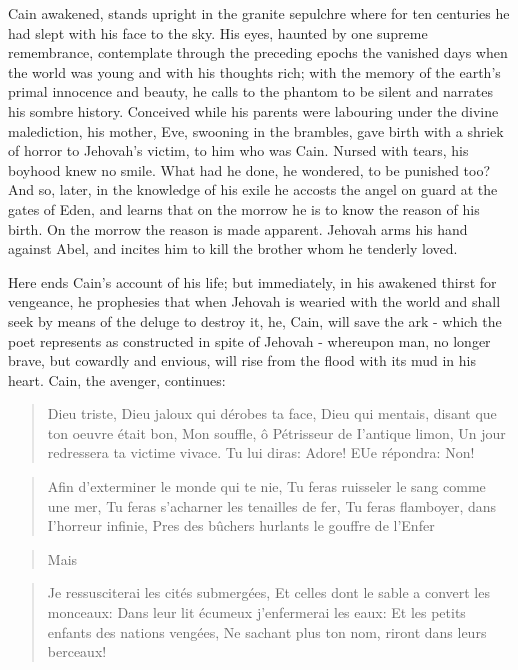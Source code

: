 \documentclass[]{book}
\begin{document}
Cain awakened, stands upright in the granite sepulchre where for ten
centuries he had slept with his face to the sky. His eyes, haunted by
one supreme remembrance, contemplate through the preceding epochs the
vanished days when the world was young and with his thoughts rich; with
the memory of the earth's primal innocence and beauty, he calls to the
phantom to be silent and narrates his sombre history. Conceived while
his parents were labouring under the divine malediction, his mother,
Eve, swooning in the brambles, gave birth with a shriek of horror to
Jehovah's victim, to him who was Cain. Nursed with tears, his boyhood
knew no smile. What had he done, he wondered, to be punished too? And
so, later, in the knowledge of his exile he accosts the angel on guard
at the gates of Eden, and learns that on the morrow he is to know the
reason of his birth. On the morrow the reason is made apparent. Jehovah
arms his hand against Abel, and incites him to kill the brother whom he
tenderly loved.

Here ends Cain's account of his life; but immediately, in his awakened
thirst for vengeance, he prophesies that when Jehovah is wearied with
the world and shall seek by means of the deluge to destroy it, he, Cain,
will save the ark - which the poet represents as constructed in spite of
Jehovah - whereupon man, no longer brave, but cowardly and envious, will
rise from the flood with its mud in his heart. Cain, the avenger,
continues:

\begin{quote}
Dieu triste, Dieu jaloux qui dérobes ta face, Dieu qui mentais, disant
que ton oeuvre était bon, Mon souffle, ô Pétrisseur de I'antique limon,
Un jour redressera ta victime vivace. Tu lui diras: Adore! EUe répondra:
Non!
\end{quote}

\begin{quote}
Afin d'exterminer le monde qui te nie, Tu feras ruisseler le sang comme
une mer, Tu feras s'acharner les tenailles de fer, Tu feras flamboyer,
dans I'horreur infinie, Pres des bûchers hurlants le gouffre de l'Enfer
\end{quote}

\begin{quote}
Mais
\end{quote}

\begin{quote}
Je ressusciterai les cités submergées, Et celles dont le sable a convert
les monceaux: Dans leur lit écumeux j'enfermerai les eaux: Et les petits
enfants des nations vengées, Ne sachant plus ton nom, riront dans leurs
berceaux!
\end{quote}
\end{document}
